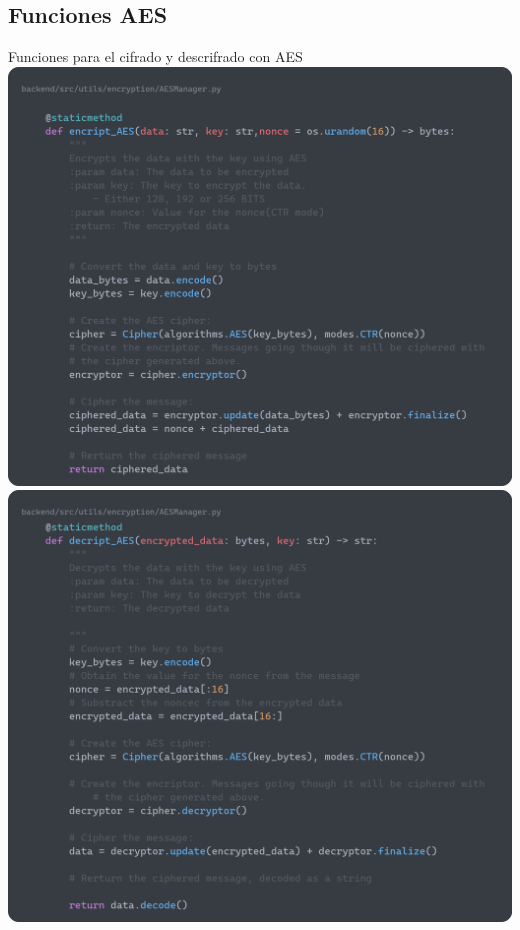 \documentclass[a4paper,11pt]{article}
\begin{document}
\subsection{Funciones AES}
    Funciones para el cifrado y descrifrado con AES
    \label{sec:funcionesAES}
    \includegraphics[width=\textwidth]{images/encript_AES.png}
    \includegraphics[width=\textwidth]{images/decript_AES.png}
\end{document}
